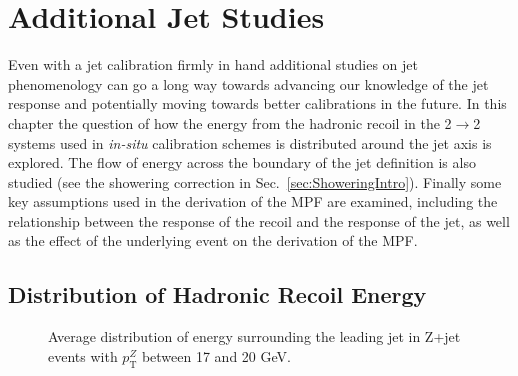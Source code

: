 \chapter{Additional Jet Studies}

Even with a jet calibration firmly in hand additional studies on jet phenomenology can go a long way towards advancing our knowledge of the jet response and potentially moving towards better calibrations in the future.  
In this chapter the question of how the energy from the hadronic recoil in the 2$\rightarrow$2 systems used in \textit {in-situ} calibration schemes is distributed around the jet axis is explored.  
The flow of energy across the boundary of the jet definition is also studied (see the showering correction in Sec.~\ref{sec:ShoweringIntro}).  
Finally some key assumptions used in the derivation of the MPF are examined, including the relationship between the response of the recoil and the response of the jet, as well as the effect of the underlying event on the derivation of the MPF.  

\section{Distribution of Hadronic Recoil Energy}
\label{Sec:EnergyDensity}
\begin{figure}[!ht]
 \begin{center}
 \end{center}
 \caption[Recoil energy distribution in Z+jet, 17-20 GeV]
 {\small Average distribution of energy surrounding the leading jet in Z+jet events with $p_{\mathrm T}^{Z}$ between 17 and 20 GeV. }
 \label{Fig:EMShape17-20}
\end{figure}

